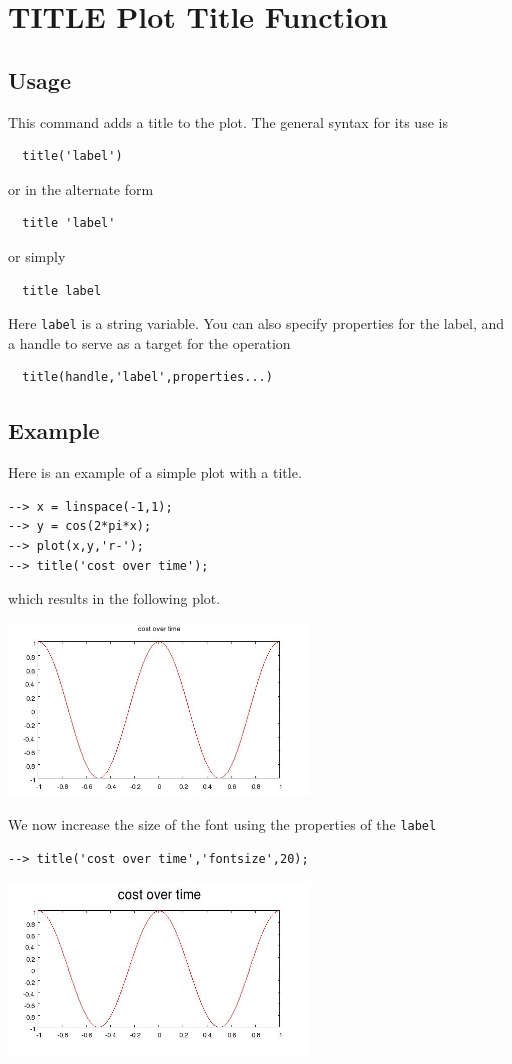 \section{TITLE Plot Title Function}

\subsection{Usage}

This command adds a title to the plot.  The general syntax
for its use is
\begin{verbatim}
  title('label')
\end{verbatim}
or in the alternate form
\begin{verbatim}
  title 'label'
\end{verbatim}
or simply
\begin{verbatim}
  title label
\end{verbatim}
Here \verb|label| is a string variable.  You can also specify 
properties for the label, and a handle to serve as a target
for the operation
\begin{verbatim}
  title(handle,'label',properties...)
\end{verbatim}
\subsection{Example}

Here is an example of a simple plot with a title.
\begin{verbatim}
--> x = linspace(-1,1);
--> y = cos(2*pi*x);
--> plot(x,y,'r-');
--> title('cost over time');
\end{verbatim}
which results in the following plot.


\centerline{\includegraphics[width=8cm]{title1}}

We now increase the size of the font using the properties
of the \verb|label|
\begin{verbatim}
--> title('cost over time','fontsize',20);
\end{verbatim}


\centerline{\includegraphics[width=8cm]{title2}}

